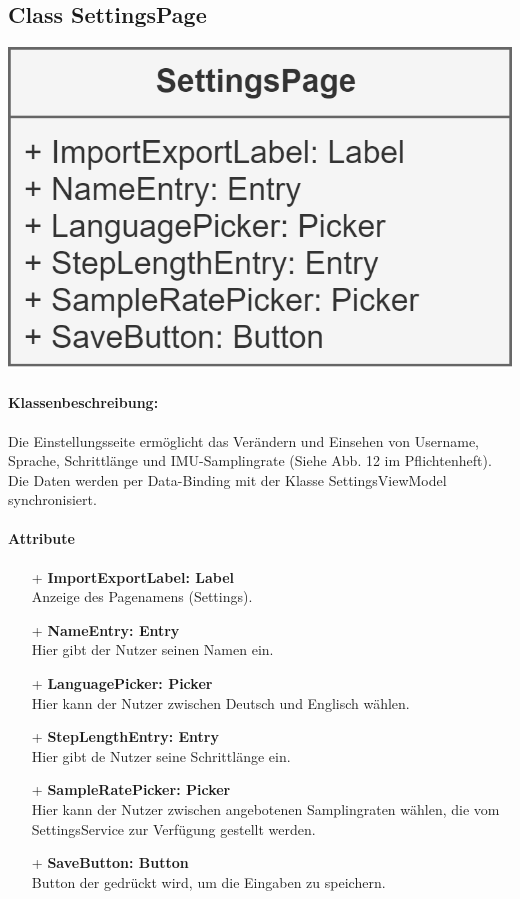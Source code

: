 \documentclass[a4paper,12pt]{article}
\begin{document}
	\begin{minipage}[b]{0.7\textwidth}

		\subsection{Class SettingsPage}
	\end{minipage}
	\begin{minipage}[c]{0.3\textwidth}
		\includegraphics[width=\textwidth]{bilder/ViewKlassen/SettingsPage.png}
	\end{minipage}
		\paragraph{Klassenbeschreibung:}
		Die Einstellungsseite ermöglicht das Verändern und Einsehen von Username, Sprache, Schrittlänge und IMU-Samplingrate (Siehe Abb. 12 im Pflichtenheft). Die Daten werden per Data-Binding mit der Klasse SettingsViewModel synchronisiert.
		\paragraph{Attribute}
		\begin{itemize}
			\item[+] \textbf{ImportExportLabel: Label} \\ Anzeige des Pagenamens (Settings).
			\item [+]\textbf{NameEntry: Entry}\\ Hier gibt der Nutzer seinen Namen ein.
			\item [+]\textbf{LanguagePicker: Picker}\\ Hier kann der Nutzer zwischen Deutsch und Englisch wählen.
			\item [+]\textbf{StepLengthEntry: Entry}\\ Hier gibt de Nutzer seine Schrittlänge ein.
			\item [+]\textbf{SampleRatePicker: Picker}\\ Hier kann der Nutzer zwischen angebotenen Samplingraten wählen, die vom SettingsService zur Verfügung gestellt werden.
			\item [+]\textbf{SaveButton: Button}\\ Button der gedrückt wird, um die Eingaben zu speichern.\\
		\end{itemize}
	
\end{document}
